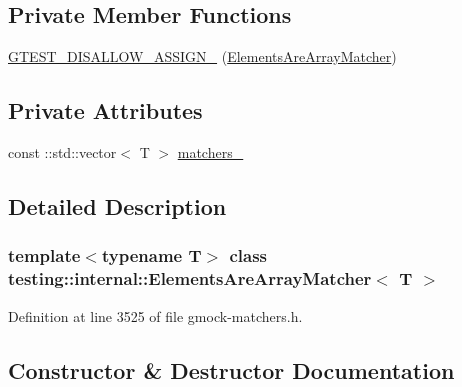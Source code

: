 \subsection*{Private Member Functions}
\begin{DoxyCompactItemize}
\item 
\hyperlink{classtesting_1_1internal_1_1ElementsAreArrayMatcher_aa8d3686a9b297a93fa0ada490a7501f6}{G\+T\+E\+S\+T\+\_\+\+D\+I\+S\+A\+L\+L\+O\+W\+\_\+\+A\+S\+S\+I\+G\+N\+\_\+} (\hyperlink{classtesting_1_1internal_1_1ElementsAreArrayMatcher}{Elements\+Are\+Array\+Matcher})
\end{DoxyCompactItemize}
\subsection*{Private Attributes}
\begin{DoxyCompactItemize}
\item 
const \+::std\+::vector$<$ T $>$ \hyperlink{classtesting_1_1internal_1_1ElementsAreArrayMatcher_af28db07928ad4eb3128d553757ed712c}{matchers\+\_\+}
\end{DoxyCompactItemize}


\subsection{Detailed Description}
\subsubsection*{template$<$typename T$>$\newline
class testing\+::internal\+::\+Elements\+Are\+Array\+Matcher$<$ T $>$}



Definition at line 3525 of file gmock-\/matchers.\+h.



\subsection{Constructor \& Destructor Documentation}
\mbox{\label{classtesting_1_1internal_1_1ElementsAreArrayMatcher_aa076a0583c29dc7da6107775bba73be8}} 
